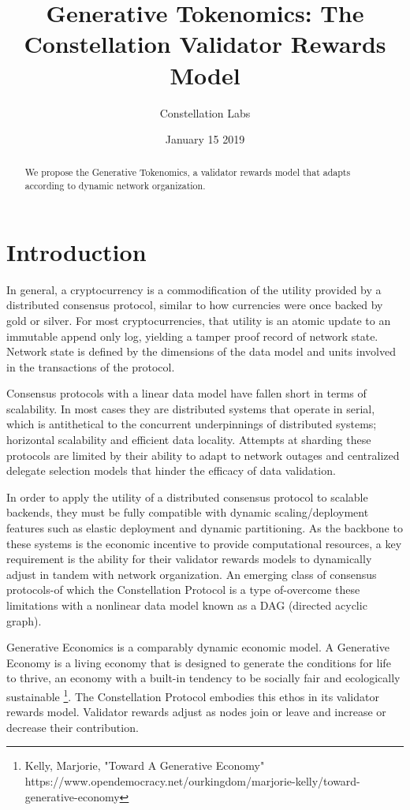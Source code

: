 \documentclass{article}
\title{Generative Tokenomics: The Constellation Validator Rewards Model}
\author{Constellation Labs}
\date{January 15 2019}
\begin{document}
\maketitle

\begin{abstract}
We propose the Generative Tokenomics, a validator rewards model that adapts according to dynamic network organization.
\end{abstract}
\setcounter{secnumdepth}{0}
\section{Introduction}
In general, a cryptocurrency is a commodification of the utility provided by a distributed consensus protocol, similar to how currencies were once backed by gold or silver. For most cryptocurrencies, that utility is an atomic update to an immutable append only log, yielding a tamper proof record of network state. Network state is defined by the dimensions of the data model and units involved in the transactions of the protocol. 

Consensus protocols with a linear data model have fallen short in terms of scalability. In most cases they are distributed systems that operate in serial, which is antithetical to the concurrent underpinnings of distributed systems; horizontal scalability and efficient data locality. Attempts at sharding these protocols are limited by their ability to adapt to network outages and centralized delegate selection models that hinder the efficacy of data validation. 

In order to apply the utility of a distributed consensus protocol to scalable backends, they must be fully compatible with dynamic scaling/deployment features such as elastic deployment and dynamic partitioning. As the backbone to these systems is the economic incentive to provide computational resources, a key requirement is the ability for their validator rewards models to dynamically adjust in tandem with network organization. An emerging class of consensus protocols-of which the Constellation Protocol is a type of-overcome these limitations with a nonlinear data model known as a DAG (directed acyclic graph).

Generative Economics is a comparably dynamic economic model. A Generative Economy is a living economy that is designed to generate the conditions for life to thrive, an economy with a built-in tendency to be socially fair and ecologically sustainable \footnote{Kelly, Marjorie, "Toward A Generative Economy" https://www.opendemocracy.net/ourkingdom/marjorie-kelly/toward-generative-economy}. The Constellation Protocol embodies this ethos in its validator rewards model. Validator rewards adjust as nodes join or leave and increase or decrease their contribution.
\end{document}
